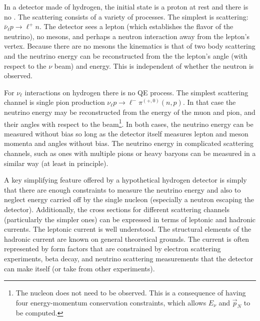 
In a detector made of hydrogen, the initial state is a proton at rest and there is no . The scattering consists of a variety of processes. The simplest is  scattering: $\bar{\nu}_\ell p \to \ell^+ n$. The detector sees a lepton (which establishes the flavor of the neutrino), no mesons, and perhaps a neutron interaction away from the lepton's vertex. Because there are no mesons the kinematics is that of two body scattering and the neutrino energy can be reconstructed from the the lepton's angle (with respect to the $\nu$ beam) and energy. This is independent of whether the neutron is observed.

For $\nu_\ell$ interactions on hydrogen there is no QE process. The simplest scattering channel is single pion production $\nu_\ell p \to \ell^- \pi^{(+,0)} (n,p)$. In that case the neutrino energy may be reconstructed from the energy of the muon and pion, and their angles with respect to the beam\footnote{The nucleon does not need to be observed. This is a consequence of having four energy-momentum conservation constraints, which allows $E_\nu$ and $\vec{p}_N$ to be computed.}. In both cases, the neutrino energy can be measured without bias so long as the detector itself measures lepton and meson momenta and angles without bias.  The neutrino energy in complicated scattering channels, such as ones with multiple pions or heavy baryons can be measured in a similar way (at least in principle).

A key simplifying feature offered by a hypothetical hydrogen detector is simply that there are enough constraints to measure the neutrino energy and also to neglect energy carried off by the single nucleon (especially a neutron escaping the detector). Additionally, the cross sections for different scattering channels (particularly the simpler ones) can be expressed in terms of leptonic and hadronic currents. The leptonic current is well understood. The structural elements of the hadronic current are known on general theoretical grounds. The current is often represented by form factors that are constrained by electron scattering experiments, beta decay, and neutrino scattering measurements that the detector can make itself (or take from other experiments). 



